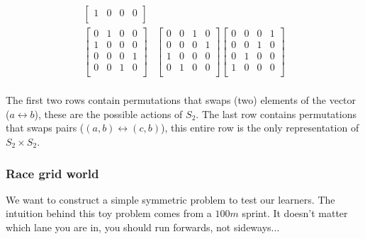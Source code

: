\begin{align*}
\begin{bmatrix}
 1 & 0 & 0 & 0 \\
 \end{bmatrix}   \\
 \begin{bmatrix}
 0 & 1 & 0 & 0 \\
 1 & 0 & 0 & 0 \\
 0 & 0 & 0 & 1 \\
 0 & 0 & 1 & 0 \\
 \end{bmatrix}
 &\begin{bmatrix}
 0 & 0 & 1 & 0 \\
 0 & 0 & 0 & 1 \\
 1 & 0 & 0 & 0 \\
 0 & 1 & 0 & 0 \\
 \end{bmatrix}
 \begin{bmatrix}
 0 & 0 & 0 & 1 \\
 0 & 0 & 1 & 0 \\
 0 & 1 & 0 & 0 \\
 1 & 0 & 0 & 0 \\
 \end{bmatrix}   \\
\end{align*}

The first two rows contain permutations that swaps (two) elements of the vector ($a\leftrightarrow b$), these are the possible actions of $S_2$.
The last row contains permutations that swaps pairs ($(a, b) \leftrightarrow (c, b)$), this entire row is the only representation of $S_2 \times S_2$.

\subsubsection{Race grid world}\label{race-grid-world}

We want to construct a simple symmetric problem to test our learners.
The intuition behind this toy problem comes from a $100m$ sprint.
It doesn't matter which lane you are in, you should run forwards, not sideways...

